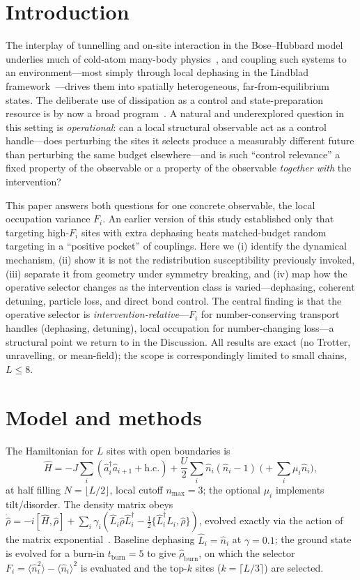 \documentclass[aps,pra,reprint,amsmath,amssymb,longbibliography,floatfix]{revtex4-2}
\newcommand{\Fi}{F_i}
\newcommand{\nop}{\hat{n}}
\newcommand{\adag}{\hat{a}^\dagger}
\newcommand{\aop}{\hat{a}}
\newcommand{\rhob}{\hat{\rho}_{\mathrm{burn}}}
\newcommand{\nexp}{\langle\nop_i\rangle}
\begin{document}
\section{Introduction}
The interplay of tunnelling and on-site interaction in the Bose--Hubbard model underlies much of
cold-atom many-body physics~\cite{fisher1989,jaksch1998,greiner2002,kuhner2000}, and coupling such
systems to an environment---most simply through local dephasing in the
Lindblad framework~\cite{lindblad1976,gorini1976,breuer2002,pichler2010,poletti2012}---drives them
into spatially heterogeneous, far-from-equilibrium states. The deliberate use of dissipation as a
control and state-preparation resource is by now a broad
program~\cite{diehl2008,verstraete2009,sieberer2016,daley2014}. A natural and underexplored
question in this setting is \emph{operational}: can a local structural observable act as a
control handle---does perturbing the sites it selects produce a measurably different future than
perturbing the same budget elsewhere---and is such ``control relevance'' a fixed property of the
observable or a property of the observable \emph{together with} the intervention?

This paper answers both questions for one concrete observable, the local occupation variance
$\Fi$. An earlier version of this study established only that targeting high-$\Fi$ sites with extra
dephasing beats matched-budget random targeting in a ``positive pocket'' of couplings. Here we
(i) identify the dynamical mechanism, (ii) show it is not the redistribution susceptibility
previously invoked, (iii) separate it from geometry under symmetry breaking, and (iv) map how the
operative selector changes as the intervention class is varied---dephasing, coherent detuning,
particle loss, and direct bond control. The central finding is that the operative selector is
\emph{intervention-relative}---$\Fi$ for number-conserving transport handles (dephasing,
detuning), local occupation for number-changing loss---a structural point we return to in the
Discussion. All results are exact (no Trotter,
unravelling, or mean-field); the scope is correspondingly limited to small chains, $L\le8$.

\section{Model and methods}
The Hamiltonian for $L$ sites with open boundaries is
\begin{equation}
\hat H=-J\sum_{i}(\adag_i\aop_{i+1}+\mathrm{h.c.})+\frac{U}{2}\sum_i\nop_i(\nop_i-1)
\;\Big(+\sum_i\mu_i\nop_i\Big),
\end{equation}
at half filling $N=\lfloor L/2\rfloor$, local cutoff $n_{\max}=3$; the optional $\mu_i$ implements
tilt/disorder. The density matrix obeys
$\dot{\hat\rho}=-i[\hat H,\hat\rho]+\sum_i\gamma_i(\hat L_i\hat\rho\hat L_i^\dagger-\tfrac12\{\hat L_i^\dagger\hat L_i,\hat\rho\})$,
evolved exactly via the action of the matrix exponential~\cite{scipy2020}. Baseline dephasing
$\hat L_i=\nop_i$ at $\gamma=0.1$; the ground state is evolved for a burn-in $t_{\mathrm{burn}}=5$
to give $\rhob$, on which the selector $\Fi=\langle\nop_i^2\rangle-\nexp^2$ is evaluated and the
top-$k$ sites ($k=\lceil L/3\rceil$) are selected.
\end{document}
